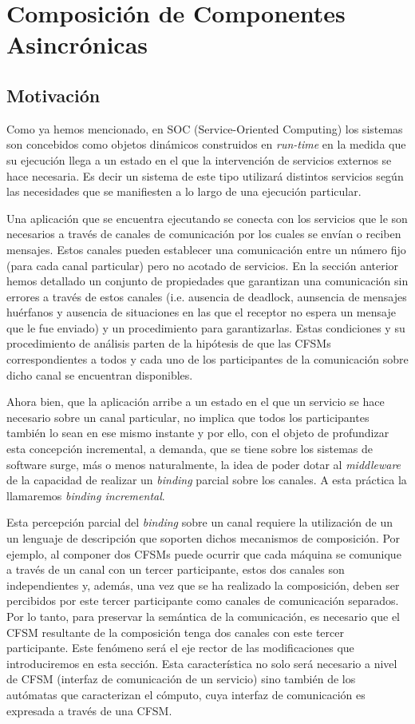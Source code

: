 
\section{Composición de Componentes Asincrónicas}
\subsection{Motivación}

 Como ya hemos mencionado, en SOC (Service-Oriented Computing) los sistemas son concebidos como objetos dinámicos construidos en \emph{run-time} en la medida que su ejecución llega a un estado en el que la intervención de servicios externos se hace necesaria. Es decir un sistema de este tipo utilizará distintos servicios según las necesidades que se manifiesten a lo largo de una ejecución particular. 
 
 Una aplicación que se encuentra ejecutando se conecta con los servicios que le son necesarios a través de canales de comunicación por los cuales se envían o reciben mensajes. Estos canales pueden establecer una comunicación entre un número fijo (para cada canal particular) pero no acotado de servicios. En la sección anterior hemos detallado un conjunto de propiedades que garantizan una comunicación sin errores a través de estos canales (i.e. ausencia de deadlock, aunsencia de mensajes huérfanos y ausencia de situaciones en las que el receptor no espera un mensaje que le fue enviado) y un procedimiento para garantizarlas. Estas condiciones y su procedimiento de análisis parten de la hipótesis de que las CFSMs correspondientes a todos y cada uno de los participantes de la comunicación sobre dicho canal se encuentran disponibles.

Ahora bien, que la aplicación arribe a un estado en el que un servicio se hace necesario sobre un canal particular, no implica que todos los participantes también lo sean en ese mismo instante y por ello, con el objeto de profundizar esta concepción incremental, a demanda, que se tiene sobre los sistemas de software surge, más o menos naturalmente, la idea de poder dotar al \emph{middleware} de la capacidad de realizar un \emph{binding} parcial sobre los canales. A esta práctica la llamaremos \emph{binding incremental}.
 
Esta percepción parcial del \emph{binding} sobre un canal requiere la utilización de un un lenguaje de descripción que soporten dichos mecanismos de composición. Por ejemplo, al componer dos CFSMs puede ocurrir que cada máquina se comunique a través de un canal con un tercer participante, estos dos canales son independientes y, además, una vez que se ha realizado la composición, deben ser percibidos por este tercer participante como canales de comunicación separados. Por lo tanto, para preservar la semántica de la comunicación, es necesario que el CFSM resultante de la composición tenga dos canales con este tercer participante. Este fenómeno será el eje rector de las modificaciones que introduciremos en esta sección. Esta característica no solo será necesario a nivel de CFSM (interfaz de comunicación de un servicio) sino también de los autómatas que caracterizan el cómputo, cuya interfaz de comunicación es expresada a través de una CFSM.


